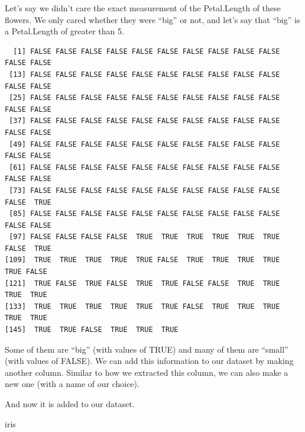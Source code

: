 \documentclass[
  letterpaper,
  DIV=11,
  numbers=noendperiod]{scrreprt}
\newenvironment{Shaded}{\begin{snugshade}}{\end{snugshade}}
\newcommand{\DecValTok}[1]{\textcolor[rgb]{0.68,0.00,0.00}{#1}}
\newcommand{\NormalTok}[1]{\textcolor[rgb]{0.00,0.23,0.31}{#1}}
\newcommand{\OtherTok}[1]{\textcolor[rgb]{0.00,0.23,0.31}{#1}}
\newcommand{\SpecialCharTok}[1]{\textcolor[rgb]{0.37,0.37,0.37}{#1}}
\begin{document}
Let's say we didn't care the exact measurement of the Petal.Length of
these flowers. We only cared whether they were ``big'' or not, and let's
say that ``big'' is a Petal.Length of greater than 5.

\begin{Shaded}
\end{Shaded}

\begin{verbatim}
  [1] FALSE FALSE FALSE FALSE FALSE FALSE FALSE FALSE FALSE FALSE FALSE FALSE
 [13] FALSE FALSE FALSE FALSE FALSE FALSE FALSE FALSE FALSE FALSE FALSE FALSE
 [25] FALSE FALSE FALSE FALSE FALSE FALSE FALSE FALSE FALSE FALSE FALSE FALSE
 [37] FALSE FALSE FALSE FALSE FALSE FALSE FALSE FALSE FALSE FALSE FALSE FALSE
 [49] FALSE FALSE FALSE FALSE FALSE FALSE FALSE FALSE FALSE FALSE FALSE FALSE
 [61] FALSE FALSE FALSE FALSE FALSE FALSE FALSE FALSE FALSE FALSE FALSE FALSE
 [73] FALSE FALSE FALSE FALSE FALSE FALSE FALSE FALSE FALSE FALSE FALSE  TRUE
 [85] FALSE FALSE FALSE FALSE FALSE FALSE FALSE FALSE FALSE FALSE FALSE FALSE
 [97] FALSE FALSE FALSE FALSE  TRUE  TRUE  TRUE  TRUE  TRUE  TRUE FALSE  TRUE
[109]  TRUE  TRUE  TRUE  TRUE  TRUE FALSE  TRUE  TRUE  TRUE  TRUE  TRUE FALSE
[121]  TRUE FALSE  TRUE FALSE  TRUE  TRUE FALSE FALSE  TRUE  TRUE  TRUE  TRUE
[133]  TRUE  TRUE  TRUE  TRUE  TRUE  TRUE FALSE  TRUE  TRUE  TRUE  TRUE  TRUE
[145]  TRUE  TRUE FALSE  TRUE  TRUE  TRUE
\end{verbatim}

Some of them are ``big'' (with values of TRUE) and many of them are
``small'' (with values of FALSE). We can add this information to our
dataset by making another column. Similar to how we extracted this
column, we can also make a new one (with a name of our choice).

\begin{Shaded}
\end{Shaded}

And now it is added to our dataset.

\begin{Shaded}
\begin{Highlighting}[]
\NormalTok{iris}
\end{Highlighting}
\end{Shaded}
\end{document}
